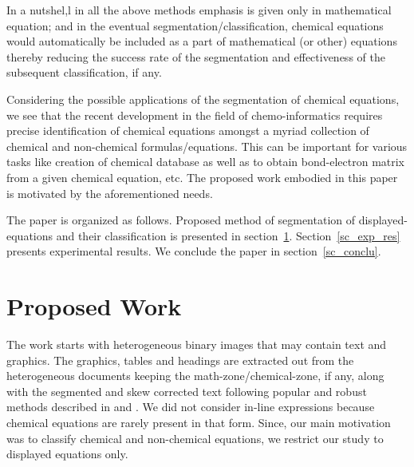 \documentclass[12pt]{IEEEtran}
\begin{document}
 In a nutshel,l in all the above methods emphasis is given only in mathematical equation; and in the eventual segmentation/classification, chemical equations would automatically be included as a part of mathematical (or other) equations thereby reducing the success rate  of the segmentation and effectiveness of the
subsequent classification, if any.

  Considering the possible applications of the segmentation of chemical equations, we see that the recent development in the field of chemo-informatics requires precise identification of chemical equations amongst a myriad collection of chemical and non-chemical
  formulas/equations. This can be important for various tasks like creation of chemical database as well as to obtain bond-electron matrix from a given chemical equation, etc.
  The proposed work  embodied in this paper is motivated by the aforementioned needs. 


The  paper is organized as follows. 
Proposed method of segmentation of displayed-equations and their classification is presented in section~\ref{sc:algo}. 
Section~\ref{sc_exp_res} presents experimental results.
We conclude the paper in section~\ref{sc_conclu}.


\section{Proposed Work}
\label{sc:algo}



The work starts with  heterogeneous binary images that  may contain text and graphics.
The graphics, tables and headings are extracted out from the heterogeneous documents keeping the  math-zone/chemical-zone, if any, along
with the  segmented and skew corrected text following popular and robust methods described in \cite{skm_06} and \cite{skm_07}.  
We did not consider in-line expressions because chemical equations are rarely present in that form. Since, our main motivation was to classify chemical and non-chemical equations, we restrict our study to displayed equations only.
\end{document}
